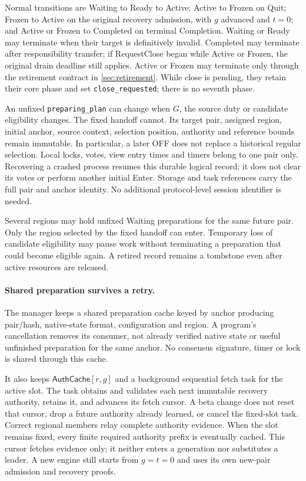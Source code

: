 \documentclass[11pt,a4paper]{article}
\newcommand{\tagg}[1]{\ensuremath{\mathsf{#1}}}
\newcounter{protocol}
\begin{document}
Normal transitions are Waiting to Ready to Active; Active to Frozen
on Quit; Frozen to Active on the original recovery admission, with
$g$ advanced and $t=0$; and Active or Frozen to Completed on terminal
Completion. Waiting or Ready may terminate when their target is
definitively invalid. Completed may terminate after responsibility
transfer; if RequestClose began while Active or Frozen, the original
drain deadline still applies. Active or Frozen may terminate only through the retirement
contract in \cref{sec:retirement}. While close is pending, they retain
their core phase and set \texttt{close\_requested}; there is no seventh
phase.

An unfixed \texttt{preparing\_plan} can change when $G$, the source
duty or candidate eligibility changes. The fixed handoff cannot.
Its target pair, assigned region, initial anchor, source context,
selection position, authority and reference bounds remain immutable.
In particular, a later OFF does not replace a historical regular
selection. Local locks, votes, view entry times and timers belong to
one pair only. Recovering a crashed process resumes this durable
logical record; it does not clear its votes or perform another initial
Enter. Storage and task references carry the full pair and anchor
identity. No additional protocol-level session identifier is needed.

Several regions may hold unfixed Waiting preparations for the same
future pair. Only the region selected by the fixed handoff can enter.
Temporary loss of candidate eligibility may pause work without
terminating a preparation that could become eligible again. A retired
record remains a tombstone even after active resources are released.

\paragraph{Shared preparation survives a retry.}
The manager keeps a shared preparation cache keyed by anchor producing
pair/hash, native-state format, configuration and region. A program's
cancellation removes its consumer, not already verified native state
or useful unfinished preparation for the same anchor. No consensus
signature, timer or lock is shared through this cache.

It also keeps $\tagg{AuthCache}[r,g]$ and a background sequential fetch
task for the active slot. The task obtains and validates each next
immutable recovery authority, retains it, and advances its fetch cursor.
A beta change does not reset that cursor, drop a future authority
already learned, or cancel the fixed-slot task. Correct regional
members relay complete authority evidence. When the slot remains
fixed, every finite required authority prefix is eventually cached.
This cursor fetches evidence only; it neither enters a generation nor
substitutes a leader. A new engine still starts from $g=t=0$ and uses
its own new-pair admission and recovery proofs.
\end{document}
